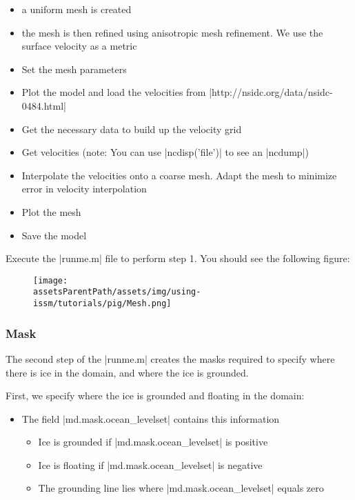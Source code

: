 \begin{itemize}
	\item a uniform mesh is created
	\item the mesh is then refined using anisotropic mesh refinement. We use the surface velocity as a metric
	\item Set the mesh parameters
	\item Plot the model and load the velocities from \lstinlinebg|http://nsidc.org/data/nsidc-0484.html|
	\item Get the necessary data to build up the velocity grid
	\item Get velocities (note: You can use \lstinlinebg|ncdisp('file')| to see an \lstinlinebg|ncdump|)
	\item Interpolate the velocities onto a coarse mesh. Adapt the mesh to minimize error in velocity interpolation
	\item Plot the mesh
	\item Save the model
\end{itemize}

Execute the \lstinlinebg|runme.m| file to perform step 1. You should see the following figure:
\begin{figure}[H]
	\begin{center}
	\texttt{[image: \\assetsParentPath/assets/img/using-issm/tutorials/pig/Mesh.png]}
	\end{center}
\end{figure}
\subsubsection{Mask}%
The second step of the \lstinlinebg|runme.m| creates the masks required to specify where there is ice in the domain, and where the ice is grounded.

First, we specify where the ice is grounded and floating in the domain:
\begin{itemize}
	\item The field \lstinlinebg|md.mask.ocean_levelset| contains this information
		\begin{itemize}
			\item Ice is grounded if \lstinlinebg|md.mask.ocean_levelset| is positive
			\item Ice is floating if \lstinlinebg|md.mask.ocean_levelset| is negative
			\item The grounding line lies where \lstinlinebg|md.mask.ocean_levelset| equals zero
		\end{itemize}
\end{itemize}

